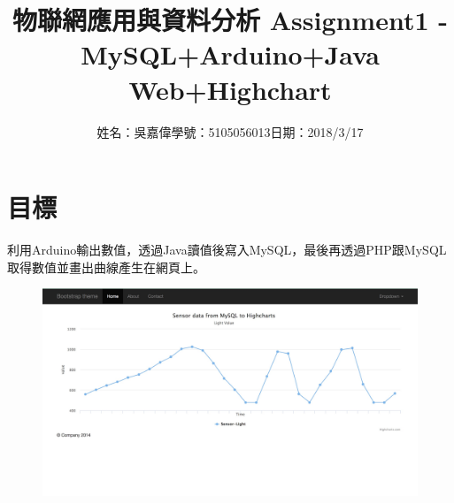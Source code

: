 \documentclass[12pt,a4paper]{article}
\title{\huge 物聯網應用與資料分析 Assignment1 - MySQL+Arduino+Java
Web+Highchart} %
\author{姓名：吳嘉偉\quad 學號：5105056013\quad 日期：2018/3/17} %
\date{} %
\begin{document}
\clearpage

\maketitle %

\section{目標}
{
\fontsize{14pt}{10pt} %
\selectfont %
利用Arduino輸出數值，透過Java讀值後寫入MySQL，最後再透過PHP跟MySQL取得數值並畫出曲線產生在網頁上。
\begin{figure}[ht]
\centering
\includegraphics[width=1.0\textwidth]{image/highcharts.jpg}
\end{figure}
}

\newpage %
\end{document}
